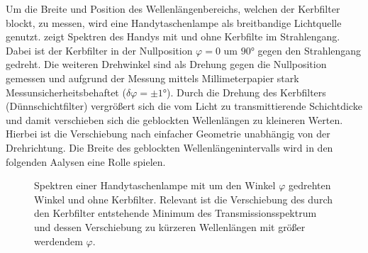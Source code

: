\documentclass[../bericht.tex]{subfiles}
\begin{document}
        Um die Breite und Position des Wellenlängenbereichs, welchen der Kerbfilter blockt, zu messen, wird eine Handytaschenlampe als breitbandige Lichtquelle genutzt.  zeigt Spektren des Handys mit und ohne Kerbfilte im Strahlengang. Dabei ist der Kerbfilter in der Nullposition $\varphi=0$ um $\ang{90}$ gegen den Strahlengang gedreht. Die weiteren Drehwinkel sind als Drehung gegen die Nullposition gemessen und aufgrund der Messung mittels Millimeterpapier stark Messunsicherheitsbehaftet ($\delta \varphi=\pm \ang{1}$). Durch die Drehung des Kerbfilters (Dünnschichtfilter) vergrößert sich die vom Licht zu transmittierende Schichtdicke und damit verschieben sich die geblockten Wellenlängen zu kleineren Werten. Hierbei ist die Verschiebung nach einfacher Geometrie unabhängig von der Drehrichtung. Die Breite des geblockten Wellenlängenintervalls wird in den folgenden Aalysen eine Rolle spielen.  

        \begin{figure}[tb]
          \caption[Spektren einer Handytaschenlampe mit um den Winkel $\varphi$ gedrehten Winkel und ohne Kerbfilter.]{Spektren einer Handytaschenlampe mit um den Winkel $\varphi$ gedrehten Winkel und ohne Kerbfilter. Relevant ist die Verschiebung des durch den Kerbfilter entstehende Minimum des Transmissionsspektrum und dessen Verschiebung zu kürzeren Wellenlängen mit größer werdendem $\varphi$.}
          \label{fig:kerbfilter-spektren}
        \end{figure}
\end{document}
